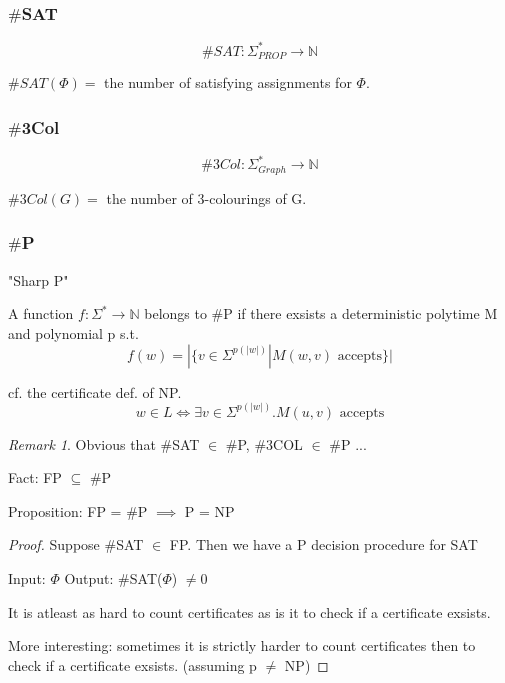 \documentclass[a4paper,12pt]{article}
\theoremstyle{definition}
\theoremstyle{remark}
\newtheorem*{remark}{Remark}
\newcommand{\N}{\mathbb{N}}
\begin{document}
\subsubsection{$\#$SAT}
\begin{equation*}
    \#SAT: \Sigma_{PROP}^* \to \N
\end{equation*}

$\#SAT(\Phi) =$ the number of satisfying assignments for $\Phi$.

\subsubsection{$\#$3Col}
\begin{equation*}
    \#3Col: \Sigma_{Graph}^* \to \N
\end{equation*}

$\#3Col(G) =$ the number of 3-colourings of G.

\subsubsection{$\#$P}
"Sharp P"

A function $f: \Sigma^* \to \N$ belongs to $\#$P if there exsists a deterministic polytime M
and polynomial p s.t.
\begin{equation*}
    f(w) = |\{v \in \Sigma^{p(|w|)} | M(w, v) \text{ accepts}\}|
\end{equation*}

cf. the certificate def. of NP.
\begin{equation*}
    w \in L \iff \exists v \in \Sigma^{p(|w|)} . M(u, v) \text{ accepts}
\end{equation*}

\begin{remark}
    Obvious that $\#$SAT $\in$ $\#$P, $\#$3COL $\in$ $\#$P ...
\end{remark}

Fact: FP $\subseteq$ $\#$P

Proposition: FP = $\#$P $\implies$ P = NP

\begin{proof}
    Suppose $\#$SAT $\in$ FP. Then we have a P decision procedure for SAT

    Input: $\Phi$
    Output: $\#$SAT($\Phi$) $\neq 0$

    It is atleast as hard to count certificates as is it to check if a certificate exsists.

    More interesting:
    sometimes it is strictly harder to count certificates then to check if a certificate exsists. (assuming p $\neq$ NP)
\end{proof}
\end{document}
